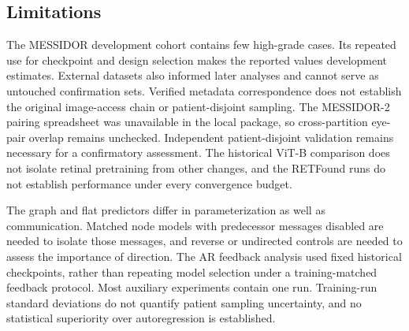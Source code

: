 \documentclass[a4paper,fleqn]{cas-sc}
\begin{document}
\begin{table}
\centering
\caption{Fixed-checkpoint sensitivity of the single-source graph to byte-identical file exclusions. Values are original $\rightarrow$ filtered evaluation protocols, without retraining.}
\label{tab:dedup}
\small
{}
\end{table}

\subsection{Limitations}

The MESSIDOR development cohort contains few high-grade cases. Its repeated use for checkpoint and design selection makes the reported values development estimates. External datasets also informed later analyses and cannot serve as untouched confirmation sets. Verified metadata correspondence does not establish the original image-access chain or patient-disjoint sampling. The MESSIDOR-2 pairing spreadsheet was unavailable in the local package, so cross-partition eye-pair overlap remains unchecked. Independent patient-disjoint validation remains necessary for a confirmatory assessment. The historical ViT-B comparison does not isolate retinal pretraining from other changes, and the RETFound runs do not establish performance under every convergence budget.

The graph and flat predictors differ in parameterization as well as communication. Matched node models with predecessor messages disabled are needed to isolate those messages, and reverse or undirected controls are needed to assess the importance of direction. The AR feedback analysis used fixed historical checkpoints, rather than repeating model selection under a training-matched feedback protocol. Most auxiliary experiments contain one run. Training-run standard deviations do not quantify patient sampling uncertainty, and no statistical superiority over autoregression is established.
\end{document}
